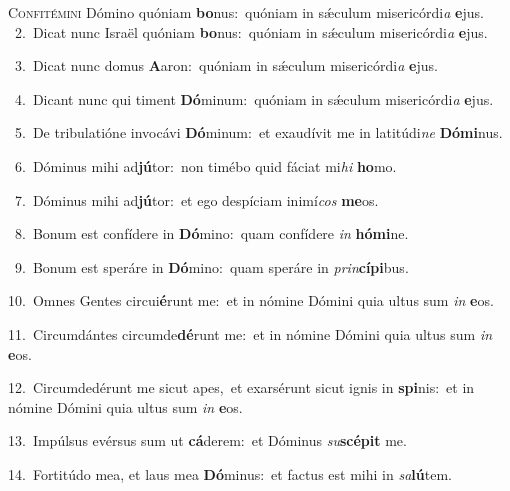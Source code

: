 \lettrine{\initial\textcolor{\initialcolor}{C}}{onfitémini} Dómino quóniam \textbf{bo}\-nus:~\star quóniam in sǽculum misericórdi\textit{a} \textbf{e}\-jus.\\
{\numbfont\textcolor{\numbcolor}{~2.}}~Dicat nunc Israël quóniam \textbf{bo}\-nus:~\star quóniam in sǽculum misericórdi\textit{a} \textbf{e}\-jus.\par
{\numbfont\textcolor{\numbcolor}{~3.}}~Dicat nunc domus \textbf{A}\-aron:~\star quóniam in sǽculum misericórdi\textit{a} \textbf{e}\-jus.\par
{\numbfont\textcolor{\numbcolor}{~4.}}~Dicant nunc qui timent \textbf{Dó}\-minum:~\star quóniam in sǽculum misericórdi\textit{a} \textbf{e}\-jus.\par
{\numbfont\textcolor{\numbcolor}{~5.}}~De tribulatióne invocávi \textbf{Dó}\-minum:~\star et exaudívit me in latitúdi\textit{ne} \textbf{Dó}\-\textbf{mi}nus.\par
{\numbfont\textcolor{\numbcolor}{~6.}}~Dóminus mihi ad\-\textbf{jú}\-tor:~\star non timébo quid fáciat mi\textit{hi} \textbf{ho}\-mo.\par
{\numbfont\textcolor{\numbcolor}{~7.}}~Dóminus mihi ad\-\textbf{jú}\-tor:~\star et ego despíciam inimí\textit{cos} \textbf{me}\-os.\par
{\numbfont\textcolor{\numbcolor}{~8.}}~Bonum est confídere in \textbf{Dó}\-mino:~\star quam confídere \textit{in} \textbf{hó}\-\textbf{mi}ne.\par
{\numbfont\textcolor{\numbcolor}{~9.}}~Bonum est speráre in \textbf{Dó}\-mino:~\star quam speráre in \textit{prin}\-\textbf{cí}\textbf{pi}bus.\par
{\numbfont\textcolor{\numbcolor}{10.}}~Omnes Gentes circui\-\textbf{é}\-runt me:~\star et in nómine Dómini quia ultus sum \textit{in} \textbf{e}\-os.\par
{\numbfont\textcolor{\numbcolor}{11.}}~Circumdántes circumde\-\textbf{dé}\-runt me:~\star et in nómine Dómini quia ultus sum \textit{in} \textbf{e}\-os.\par
{\numbfont\textcolor{\numbcolor}{12.}}~Circumdedérunt me sicut apes,~\dagger et exarsérunt sicut ignis in \textbf{spi}\-nis:~\star et in nómine Dómini quia ultus sum \textit{in} \textbf{e}\-os.\par
{\numbfont\textcolor{\numbcolor}{13.}}~Impúlsus evérsus sum ut \textbf{cá}\-derem:~\star et Dóminus \textit{su}\-\textbf{scé}\textbf{pit} me.\par
{\numbfont\textcolor{\numbcolor}{14.}}~Fortitúdo mea, et laus mea \textbf{Dó}\-minus:~\star et factus est mihi in \textit{sa}\-\textbf{lú}tem.\par
